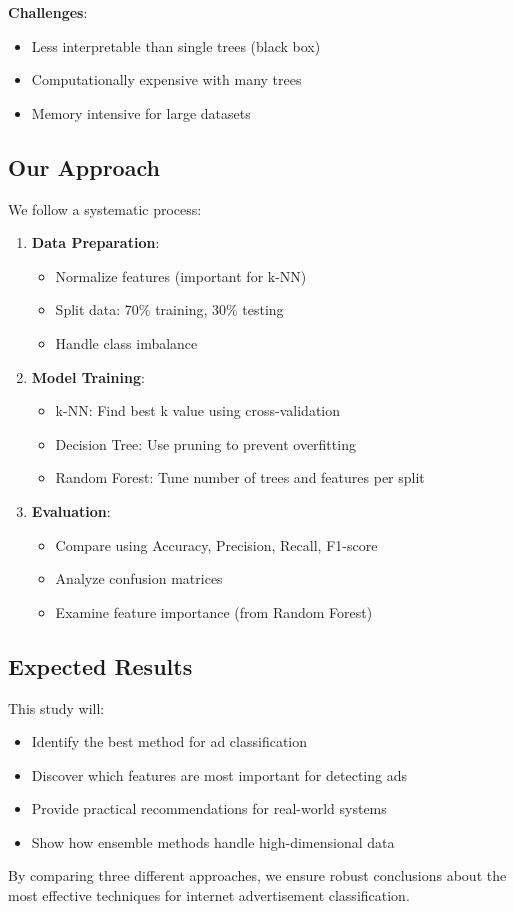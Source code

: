 \textbf{Challenges}:
\begin{itemize}
    \item Less interpretable than single trees (black box)
    \item Computationally expensive with many trees
    \item Memory intensive for large datasets
\end{itemize}

\subsection{Our Approach}
We follow a systematic process:

\begin{enumerate}
    \item \textbf{Data Preparation}: 
    \begin{itemize}
        \item Normalize features (important for k-NN)
        \item Split data: 70\% training, 30\% testing
        \item Handle class imbalance
    \end{itemize}
    
    \item \textbf{Model Training}:
    \begin{itemize}
        \item k-NN: Find best k value using cross-validation
        \item Decision Tree: Use pruning to prevent overfitting
        \item Random Forest: Tune number of trees and features per split
    \end{itemize}
    
    \item \textbf{Evaluation}:
    \begin{itemize}
        \item Compare using Accuracy, Precision, Recall, F1-score
        \item Analyze confusion matrices
        \item Examine feature importance (from Random Forest)
    \end{itemize}
\end{enumerate}

\subsection{Expected Results}
This study will:
\begin{itemize}
    \item Identify the best method for ad classification
    \item Discover which features are most important for detecting ads
    \item Provide practical recommendations for real-world systems
    \item Show how ensemble methods handle high-dimensional data
\end{itemize}

By comparing three different approaches, we ensure robust conclusions about the most effective techniques for internet advertisement classification.